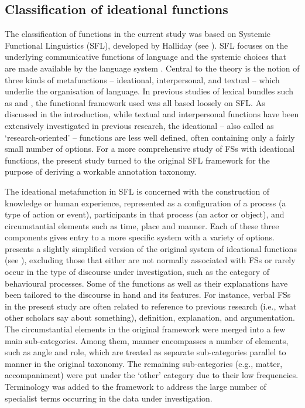 \subsection{Classification of ideational functions}

The classification of functions in the current study was based on Systemic Functional Linguistics (SFL), developed by Halliday (see \citealt{Halliday2014}). SFL focuses on the underlying communicative functions of language and the systemic choices that are made available by the language system \citep{Gledhill2011}. Central to the theory is the notion of three kinds of metafunctions – ideational, interpersonal, and textual – which underlie the organisation of language. In previous studies of lexical bundles such as \citet{Hyland2008} and \citet{BiberEtAl2004}, the functional framework used was all based loosely on SFL. As discussed in the introduction, while textual and interpersonal functions have been extensively investigated in previous research, the ideational – also called as ‘research-oriented’ – functions are less well defined, often containing only a fairly small number of options. For a more comprehensive study of FSs with ideational functions, the present study turned to the original SFL framework for the purpose of deriving a workable annotation taxonomy.

The ideational metafunction in SFL is concerned with the construction of knowledge or human experience, represented as a configuration of a process (a type of action or event), participants in that process (an actor or object), and circumstantial elements such as time, place and manner. Each of these three components gives entry to a more specific system with a variety of options.  presents a slightly simplified version of the original system of ideational functions (see \citealt{Halliday2014}), excluding those that either are not normally associated with FSs or rarely occur in the type of discourse under investigation, such as the category of behavioural processes. Some of the functions as well as their explanations have been tailored to the discourse in hand and its features. For instance, verbal FSs in the present study are often related to reference to previous research (i.e., what other scholars say about something), definition, explanation, and argumentation. The circumstantial elements in the original framework were merged into a few main sub-categories. Among them, manner encompasses a number of elements, such as angle and role, which are treated as separate sub-categories parallel to manner in the original taxonomy. The remaining sub-categories (e.g., matter, accompaniment) were put under the ‘other’ category due to their low frequencies. Terminology was added to the framework to address the large number of specialist terms occurring in the data under investigation.


